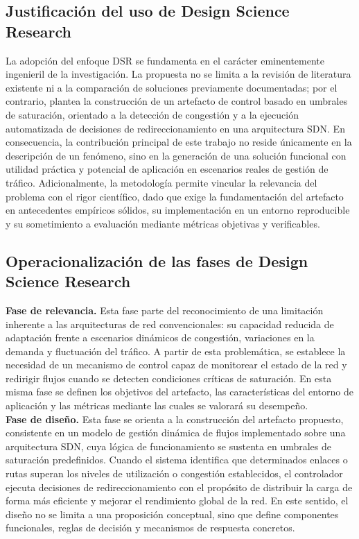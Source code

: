 \documentclass[12pt,a4paper]{article}
\begin{document}
\subsection{Justificación del uso de Design Science Research}
La adopción del enfoque DSR se fundamenta en el carácter eminentemente ingenieril de la investigación. La propuesta no se limita a la revisión de literatura existente ni a la comparación de soluciones previamente documentadas; por el contrario, plantea la construcción de un artefacto de control basado en umbrales de saturación, orientado a la detección de congestión y a la ejecución automatizada de decisiones de redireccionamiento en una arquitectura SDN. En consecuencia, la contribución principal de este trabajo no reside únicamente en la descripción de un fenómeno, sino en la generación de una solución funcional con utilidad práctica y potencial de aplicación en escenarios reales de gestión de tráfico. Adicionalmente, la metodología permite vincular la relevancia del problema con el rigor científico, dado que exige la fundamentación del artefacto en antecedentes empíricos sólidos, su implementación en un entorno reproducible y su sometimiento a evaluación mediante métricas objetivas y verificables.

\subsection{Operacionalización de las fases de Design Science Research}
\textbf{Fase de relevancia.} Esta fase parte del reconocimiento de una limitación inherente a las arquitecturas de red convencionales: su capacidad reducida de adaptación frente a escenarios dinámicos de congestión, variaciones en la demanda y fluctuación del tráfico. A partir de esta problemática, se establece la necesidad de un mecanismo de control capaz de monitorear el estado de la red y redirigir flujos cuando se detecten condiciones críticas de saturación. En esta misma fase se definen los objetivos del artefacto, las características del entorno de aplicación y las métricas mediante las cuales se valorará su desempeño.\\

\textbf{Fase de diseño. }Esta fase se orienta a la construcción del artefacto propuesto, consistente en un modelo de gestión dinámica de flujos implementado sobre una arquitectura SDN, cuya lógica de funcionamiento se sustenta en umbrales de saturación predefinidos. Cuando el sistema identifica que determinados enlaces o rutas superan los niveles de utilización o congestión establecidos, el controlador ejecuta decisiones de redireccionamiento con el propósito de distribuir la carga de forma más eficiente y mejorar el rendimiento global de la red. En este sentido, el diseño no se limita a una proposición conceptual, sino que define componentes funcionales, reglas de decisión y mecanismos de respuesta concretos.\\
\end{document}
